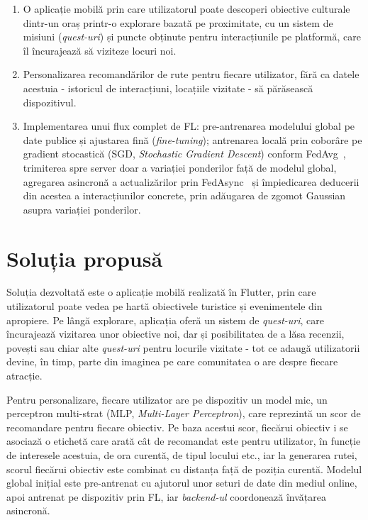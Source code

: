 \documentclass[12pt,a4paper]{report}
\begin{document}
\begin{enumerate}[label=(\alph*)]
\item O aplicație mobilă prin care utilizatorul poate descoperi obiective culturale dintr-un oraș printr-o explorare bazată pe proximitate, cu un sistem de misiuni (\textit{quest-uri}) și puncte obținute pentru interacțiunile pe platformă, care îl încurajează să viziteze locuri noi.

\item Personalizarea recomandărilor de rute pentru fiecare utilizator, fără ca datele acestuia - istoricul de interacțiuni, locațiile vizitate - să părăsească dispozitivul.

\item Implementarea unui flux complet de FL: pre-antrenarea modelului global pe date publice și ajustarea fină (\textit{fine-tuning}); antrenarea locală prin coborâre pe gradient stocastică (SGD, \textit{Stochastic Gradient Descent}) conform FedAvg~\cite{mcmahan2017fedavg}, trimiterea spre server doar a variației ponderilor față de modelul global, agregarea asincronă a actualizărilor prin FedAsync~\cite{xie2019fedasync} și împiedicarea deducerii din acestea a interacțiunilor concrete, prin adăugarea de zgomot Gaussian asupra variației ponderilor.
\end{enumerate}

\section{Soluția propusă}

Soluția dezvoltată este o aplicație mobilă realizată în Flutter, prin care utilizatorul poate vedea pe hartă obiectivele turistice și evenimentele din apropiere. Pe lângă explorare, aplicația oferă un sistem de \textit{quest-uri}, care încurajează vizitarea unor obiective noi, dar și posibilitatea de a lăsa recenzii, povești sau chiar alte \textit{quest-uri} pentru locurile vizitate - tot ce adaugă utilizatorii devine, în timp, parte din imaginea pe care comunitatea o are despre fiecare atracție.

Pentru personalizare, fiecare utilizator are pe dispozitiv un model mic, un perceptron multi-strat (MLP, \textit{Multi-Layer Perceptron}), care reprezintă un scor de recomandare pentru fiecare obiectiv. Pe baza acestui scor, fiecărui obiectiv i se asociază o etichetă care arată cât de recomandat este pentru utilizator, în funcție de interesele acestuia, de ora curentă, de tipul locului etc., iar la generarea rutei, scorul fiecărui obiectiv este combinat cu distanța față de poziția curentă. Modelul global inițial este pre-antrenat cu ajutorul unor seturi de date din mediul online, apoi antrenat pe dispozitiv prin FL, iar \textit{backend-ul} coordonează învățarea asincronă.
\end{document}
